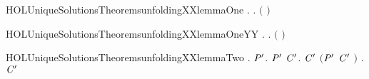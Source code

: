 \newcommand{\HOLUniqueSolutionsTheoremsSTRONGXXUNIQUEXXSOLUTIONXXLEMMA}{\UseVerbatim{HOLUniqueSolutionsTheoremsSTRONGXXUNIQUEXXSOLUTIONXXLEMMA}}
\begin{SaveVerbatim}{HOLUniqueSolutionsTheoremsunfoldingXXlemmaOne}
\HOLTokenTurnstile{} \HOLSymConst{\HOLTokenForall{}}  .
         \HOLSymConst{\HOLTokenConj{}}   \HOLSymConst{\HOLTokenConj{}}     \HOLSymConst{\HOLTokenImp{}}
       \HOLSymConst{\HOLTokenForall{}}.    \ensuremath{(} \HOLConst{\HOLTokenCompose}   \ensuremath{)} 
\end{SaveVerbatim}
\newcommand{\HOLUniqueSolutionsTheoremsunfoldingXXlemmaOne}{\UseVerbatim{HOLUniqueSolutionsTheoremsunfoldingXXlemmaOne}}
\begin{SaveVerbatim}{HOLUniqueSolutionsTheoremsunfoldingXXlemmaOneYY}
\HOLTokenTurnstile{} \HOLSymConst{\HOLTokenForall{}}  .
         \HOLSymConst{\HOLTokenConj{}}   \HOLSymConst{\HOLTokenConj{}}     \HOLSymConst{\HOLTokenImp{}}
       \HOLSymConst{\HOLTokenForall{}}.    \ensuremath{(} \HOLConst{\HOLTokenCompose}   \ensuremath{)} 
\end{SaveVerbatim}
\newcommand{\HOLUniqueSolutionsTheoremsunfoldingXXlemmaOneYY}{\UseVerbatim{HOLUniqueSolutionsTheoremsunfoldingXXlemmaOneYY}}
\begin{SaveVerbatim}{HOLUniqueSolutionsTheoremsunfoldingXXlemmaTwo}
\HOLTokenTurnstile{} \HOLSymConst{\HOLTokenForall{}}.
         \HOLSymConst{\HOLTokenImp{}}
       \HOLSymConst{\HOLTokenForall{}}  \ensuremath{\HOLBoundVar{P}\sp{\prime}}.
             \HOLTokenTransBegin{}\HOLTokenTransEnd \ensuremath{\HOLBoundVar{P}\sp{\prime}} \HOLSymConst{\HOLTokenImp{}}
           \HOLSymConst{\HOLTokenExists{}}\ensuremath{\HOLBoundVar{C}\sp{\prime}}.  \ensuremath{\HOLBoundVar{C}\sp{\prime}} \HOLSymConst{\HOLTokenConj{}} \ensuremath{(}\ensuremath{\HOLBoundVar{P}\sp{\prime}} \HOLSymConst{\ensuremath{=}} \ensuremath{\HOLBoundVar{C}\sp{\prime}} \ensuremath{)} \HOLSymConst{\HOLTokenConj{}} \HOLSymConst{\HOLTokenForall{}}.   \HOLTokenTransBegin{}\HOLTokenTransEnd \ensuremath{\HOLBoundVar{C}\sp{\prime}} 
\end{SaveVerbatim}
